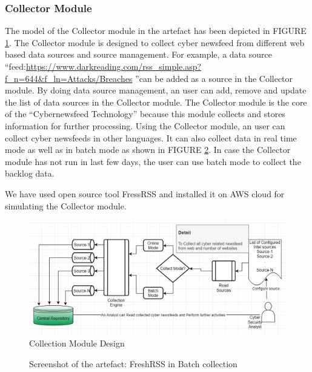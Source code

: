 \subsubsection{Collector Module}
The model of the Collector module in the artefact has been depicted in FIGURE \ref{fig:collector}.
The Collector module is designed to collect cyber newsfeed from different web based data sources and source management.   
 For example, a data source \enquote{feed:\url{https://www.darkreading.com/rss_simple.asp?f_n=644&f_ln=Attacks/Breaches} }can be added as a source in the Collector module. By doing data source management, an user can add, 
remove and update the list of data sources in the Collector module.
The Collector module is  the core of the \enquote{Cybernewsfeed Technology} because this module collects and stores information for further processing. Using the Collector module, an user can collect cyber newsfeeds in other languages.
It can also collect data in real time mode as well as in batch mode as shown in FIGURE \ref{ref:collector-batch}. 
In case the Collector module has not run in last few days, the user can use batch mode to collect the backlog data. 

We have used open source tool FressRSS and installed it on AWS cloud for simulating the Collector module.

\begin{figure}[ht]
    \centering
    \includegraphics[width=1\linewidth]{Figures/collector.png}
    \caption{Collection Module Design}
    \label{fig:collector}
\end{figure}


\begin{figure}[ht]
\centering
    \caption{Screenshot of the artefact: FreshRSS in Batch collection }
    \label{ref:collector-batch}
\end{figure}

